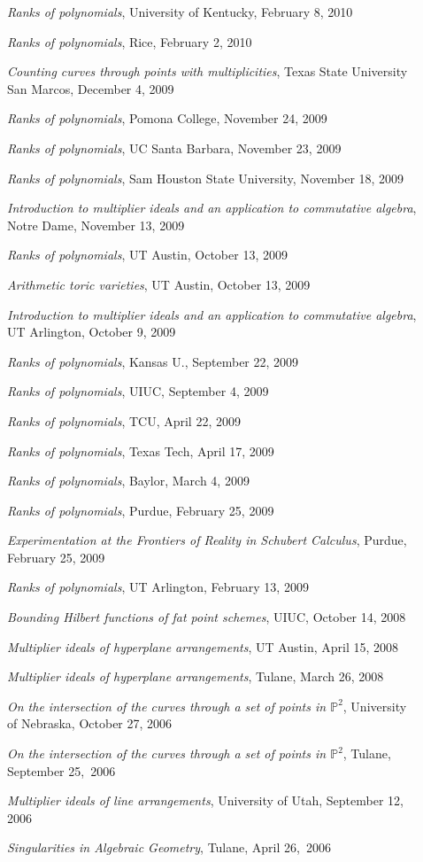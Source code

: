 \documentclass[12pt]{article}
\begin{document}
\begin{description}
\item[] \textit{Ranks of polynomials},
University of Kentucky, February 8, 2010
\item[] \textit{Ranks of polynomials},
Rice, February 2, 2010
\item[] \textit{Counting curves through points with multiplicities},
Texas State University San Marcos, December 4, 2009
\item[] \textit{Ranks of polynomials},
Pomona College, November 24, 2009
\item[] \textit{Ranks of polynomials},
UC Santa Barbara, November 23, 2009
\item[] \textit{Ranks of polynomials},
Sam Houston State University, November 18, 2009
\item[] \textit{Introduction to multiplier ideals and an application to commutative algebra},
Notre Dame, November 13, 2009
\item[] \textit{Ranks of polynomials},
UT Austin, October 13, 2009
\item[] \textit{Arithmetic toric varieties},
UT Austin, October 13, 2009
\item[] \textit{Introduction to multiplier ideals and an application to commutative algebra},
UT Arlington, October 9, 2009
\item[] \textit{Ranks of polynomials},
Kansas U., September 22, 2009
\item[] \textit{Ranks of polynomials},
UIUC, September 4, 2009
\item[] \textit{Ranks of polynomials},
TCU, April 22, 2009
\item[] \textit{Ranks of polynomials},
Texas Tech, April 17, 2009
\item[] \textit{Ranks of polynomials},
Baylor, March 4, 2009
\item[] \textit{Ranks of polynomials},
Purdue, February 25, 2009
\item[] \textit{Experimentation at the Frontiers of Reality in Schubert Calculus},
Purdue, February 25, 2009
\item[] \textit{Ranks of polynomials},
UT Arlington, February 13, 2009
\item[] \textit{Bounding Hilbert functions of fat point schemes},
UIUC, October 14, 2008
\item[] \textit{Multiplier ideals of hyperplane arrangements},
UT Austin, April 15, 2008
\item[] \textit{Multiplier ideals of hyperplane arrangements},
Tulane, March 26, 2008
\item[] \textit{On the intersection of the curves through a set of points in $\mathbb{P}^2$},
University of Nebraska, October 27, 2006
\item[] \textit{On the intersection of the curves through a set of points in $\mathbb{P}^2$},
Tulane, September 25,~2006
\item[] \textit{Multiplier ideals of line arrangements}, University of Utah, September 12, 2006
\item[] \textit{Singularities in Algebraic Geometry}, Tulane, April 26,~2006
\end{description}
\end{document}
